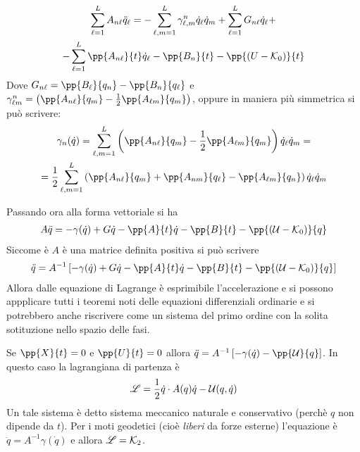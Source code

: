 \documentclass[Main.tex]{subfiles}
\begin{document}
\begin{gather}
	\sum_{\ell=1}^L A_{n \ell} \ddot q_\ell = - \sum_{\ell, m =1}^L \gamma_{\ell,m}^n \dot q_\ell \dot q_m + \sum_{\ell=1}^L G_{n \ell} \dot q_\ell + \\ - \sum_{\ell=1}^L \pp{A_{n \ell}}{t} \dot q_\ell - \pp{B_n}{t} - \pp{(U-\K_0)}{t}
\end{gather}
Dove $G_{n \ell} =\pp{B_\ell}{q_n} - \pp{B_n}{q_\ell}$ e $\gamma_{\ell m}^n = \left( \pp{A_{n \ell}}{q_m} - \frac{1}{2} \pp{A_{\ell m}}{q_m} \right)$, oppure in maniera più simmetrica si può scrivere:
\begin{gather}
	\gamma_n (\dot q) = \sum_{\ell, m =1}^L \left( \pp{A_{n \ell}}{q_m} - \frac{1}{2} \pp{A_{\ell m}}{q_m} \right) \dot q_\ell \dot q_m =\\= \frac{1}{2} \sum_{\ell , m =1 }^L \left( \pp{A_{n \ell}}{q_m} + \pp{A_{n m}}{q_\ell} - \pp{A_{\ell m}}{q_n} \right) \dot q_\ell \dot q_m
	\end{gather}

Passando ora  alla forma vettoriale si ha
\begin{gather}
	A \ddot q = - \gamma (\dot q) + G \dot q - \pp{A}{t} \dot q - \pp{B}{t} - \pp{(\U- \K_0)}{q}
\end{gather}
Siccome è $A$ è una matrice definita positiva si può scrivere
\begin{gather}
	\ddot q = A^{-1} \left[ - \gamma (\dot q) + G \dot q - \pp{A}{t} \dot q - \pp{B}{t} - \pp{(\U- \K_0)}{q} \right]
\end{gather}
Allora dalle equazione di Lagrange è esprimibile l'accelerazione e si possono appplicare tutti i teoremi noti delle equazioni differenziali ordinarie e si potrebbero anche riscrivere come un sistema del primo ordine con la solita sotituzione nello spazio delle fasi.

\begin{osservazione}
Se $\pp{X}{t} =0 $ e $\pp{U}{t}=0$ allora $
\ddot q = A^{-1} \left[- \gamma (\dot q) - \pp{\U}{q} \right]	$. In questo caso la lagrangiana di partenza è
\begin{equation}
	\mathscr{L} = \frac{1}{2} \dot q \cdot A(q) \dot q - \mathcal{U} (q, \dot q)
\end{equation}
Un tale sistema è detto sistema meccanico naturale e conservativo (perchè $q$ non dipende da $t$).
Per i moti geodetici (cioè \emph{liberi} da forze esterne) l'equazione è $\ddot q=A^{-1} \gamma (\dot q)$ e allora $\mathscr{L}=\mathcal{K}_2$.
\end{osservazione}
\end{document}
